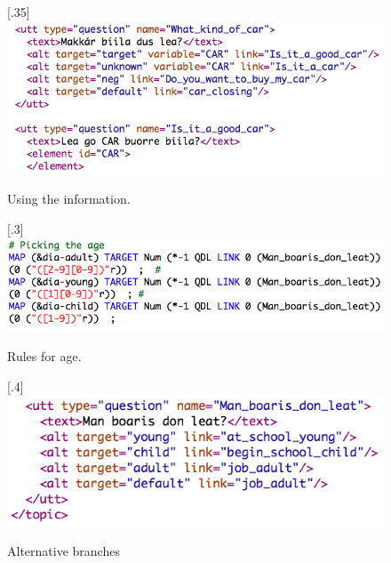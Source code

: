 \documentclass[11pt]{article}
\begin{document}
\begin{figure}%
\begin{center}
\scalebox{.35}[.35]{\includegraphics{presentation/img/what_car.png}}\\
\caption{Using the information.}
\end{center}
\end{figure}

\begin{figure}%
\begin{center}
\scalebox{.3}[.3]{\includegraphics{presentation/img/pickingage_colours.png}}\\
\caption{Rules for age.}
\end{center}
\end{figure}

\begin{figure}%
\begin{center}
\scalebox{.4}[.4]{\includegraphics{presentation/img/age_branching.png}}\\
\caption{Alternative branches}
\end{center}
\end{figure}
\end{document}
